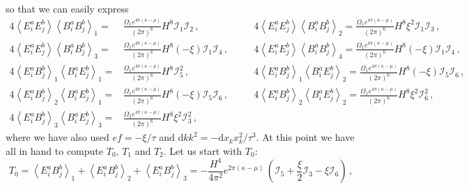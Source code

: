 so that we can easily express
\begin{align}
  4 \left \langle E^a_{i} E^b_{j} \right \rangle \left \langle B^a_{i} B^b_{j} \right \rangle_1   = & \frac{\Omega_1 e^{4 \pi (\kappa - \mu)}}{ (2 \pi)^6} H^8  \mathcal{I}_1 \mathcal{I}_2  \, , \quad 
  && 4 \left \langle E^a_{i} E^b_{j} \right \rangle \left \langle B^a_{i} B^b_{j} \right \rangle_2   =  \frac{\Omega_1 e^{4 \pi (\kappa - \mu)}}{ (2 \pi)^6} H^8 \xi^2  \mathcal{I}_1 \mathcal{I}_3  \, , \nonumber  \\
  4 \left \langle E^a_{i} E^b_{j} \right \rangle \left \langle B^a_{i} B^b_{j} \right \rangle_3  = & \frac{\Omega_1 e^{4 \pi (\kappa - \mu)}}{ (2 \pi)^6} H^8 (-\xi) \mathcal{I}_1  \mathcal{I}_4  \, , \quad
  && 4 \left \langle E^a_{i} E^b_{j} \right \rangle \left \langle B^a_{i} B^b_{j} \right \rangle_4   =  \frac{\Omega_1 e^{4 \pi (\kappa - \mu)}}{ (2 \pi)^6} H^8 (-\xi)  \mathcal{I}_1  \mathcal{I}_4  \, , \nonumber \\
  4 \left \langle E^a_{i} B^b_{j} \right \rangle_1 \left \langle B^a_{i} E^b_{j} \right \rangle_1   = & \frac{\Omega_1 e^{4 \pi (\kappa - \mu)}}{ (2 \pi)^6} H^8  \mathcal{I}_5^2  \, , \quad 
  && 4 \left \langle E^a_{i} B^b_{j} \right \rangle_1 \left \langle B^a_{i} E^b_{j} \right \rangle_2   =  \frac{\Omega_1 e^{4 \pi (\kappa - \mu)}}{ (2 \pi)^6} H^8 (-\xi)  \mathcal{I}_5  \mathcal{I}_6  \, , \nonumber \\
  4 \left \langle E^a_{i} B^b_{j} \right \rangle_2 \left \langle B^a_{i} E^b_{j} \right \rangle_1   = & \frac{\Omega_1 e^{4 \pi (\kappa - \mu)}}{ (2 \pi)^6} H^8 (-\xi)  \mathcal{I}_5 \mathcal{I}_6  \, , \quad
  && 4 \left \langle E^a_{i} B^b_{j} \right \rangle_2 \left \langle B^a_{i} E^b_{j} \right \rangle_2   =  \frac{\Omega_1 e^{4 \pi (\kappa - \mu)}}{ (2 \pi)^6} H^8 \xi^2  \mathcal{I}_6^2 \, , \nonumber \\
  4 \left \langle E^a_{i} B^b_{j} \right \rangle_3 \left \langle B^a_{i} E^b_{j} \right \rangle_3   = & \frac{\Omega_2 e^{4 \pi (\kappa - \mu)}}{ (2 \pi)^6} H^8 \xi^2 \mathcal{I}_3^2 \, , 
\end{align}
where we have also used $ef = -\xi/\tau$ and $\textrm{d}k k^2 = - \textrm{d}x_k x_k^2 /\tau^3 $. At this point we have all in hand to compute $ T_0 $, $ T_1 $ and $ T_2 $. Let us start with $T_0$:
\begin{equation}
  T_0 = \left \langle E^a_{i} B^b_{j} \right \rangle_1 + \left \langle E^a_{i} B^b_{j} \right \rangle_2 + \left \langle E^a_{i} B^b_{j} \right \rangle_3 = - \frac{H^4}{4 \pi^2} e^{2 \pi (\kappa - \mu)} \,  \left( \mathcal{I}_5 + \frac{\xi}{2} \mathcal{I}_3 - \xi \mathcal{I}_6 \right) \, ,
\end{equation}
